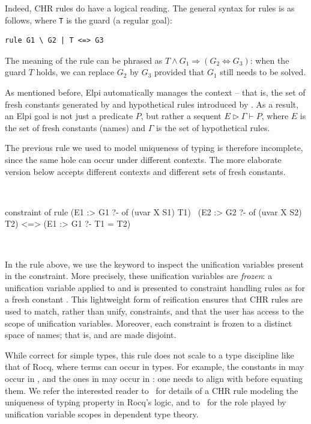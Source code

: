 \documentclass[a4paper, 11pt]{book}
\newenvironment{elpicode}
  {\VerbatimEnvironment~\\\begin{elpibox}\begin{xelpicode}}{\end{xelpicode}
\end{elpibox}\\}
\begin{document}
Indeed, CHR rules do have a logical reading. The general syntax for rules is
as follows, where \texttt{T} is the guard (a regular goal):

\begin{chrbox}\begin{verbatim}
rule G1 \ G2 | T <=> G3
\end{verbatim}
\end{chrbox}

\noindent
The meaning of the rule can be phrased as $T \land G_1 \Rightarrow (G_2
\Leftrightarrow G_3)$: when the guard $T$ holds, we can replace $G_2$ by $G_3$
provided that $G_1$ still needs to be solved.

As mentioned before, Elpi automatically manages the context -- that is, the set
of fresh constants generated by  and hypothetical rules introduced by
\elpi{=>}. As a result, an Elpi goal is not just a predicate $P$, but rather a
sequent $E \triangleright  \Gamma \vdash P$, where $E$ is the set of fresh
constants (names) and $\Gamma$ is the set of hypothetical rules.

The previous rule we used to model uniqueness of typing is therefore incomplete,
since the same hole can occur under different contexts. The more elaborate
version below accepts different contexts and different sets of fresh constants.


\begin{elpicode}
constraint of {
  rule (E1 :> G1 ?- of (uvar X S1) T1)
     \ (E2 :> G2 ?- of (uvar X S2) T2)
   <=> (E1 :> G1 ?- T1 = T2)
}
\end{elpicode}

\noindent
In the rule above, we use the keyword  to inspect the unification
variables present in the constraint. More precisely, these unification
variables are \emph{frozen}: a unification variable  applied to
 and  is presented to constraint handling rules as
 for a fresh constant . This lightweight form of
reification ensures that CHR rules are used to match, rather than unify,
constraints, and that the user has access to the scope of unification
variables. Moreover, each constraint is frozen to a distinct space of names;
that is,  and  are made disjoint.


While correct for simple types, this rule does not scale to a type
discipline like that of Rocq, where terms can occur in types. For example,
the constants in  may occur in , and the
ones in  may occur in : one needs to align 
with  before equating them.
We refer the interested reader to~\cite{TASSI_2019} for details of a CHR rule modeling
the uniqueness of typing property in Rocq's logic, and to~\cite{Jojgov} for
the role played by unification variable scopes in dependent type theory.
\end{document}
